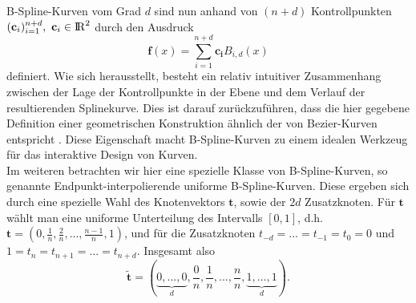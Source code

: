 \documentclass{article}
\newcommand{\R}{{\rm I\!R}}
\begin{document}
\noindent B-Spline-Kurven vom Grad $d$ sind nun anhand von $(n+d)$ Kontrollpunkten $(\mathbf{c}_i)_{i=1}^{n+d},\ \mathbf{c}_i\in\R^2$ durch den Ausdruck
\[
\mathbf{f}(x)=\sum_{i=1}^{n+d}\mathbf{c_i}B_{i,d}(x)
\]
definiert. Wie sich herausstellt, besteht ein relativ intuitiver Zusammenhang zwischen der Lage der Kontrollpunkte in der Ebene und dem Verlauf der resultierenden Splinekurve. Dies ist darauf zurückzuführen, dass die hier gegebene Definition einer geometrischen Konstruktion ähnlich der von Bezier-Kurven entspricht
. Diese Eigenschaft macht B-Spline-Kurven zu einem idealen Werkzeug für das interaktive Design von Kurven.\\

\noindent Im weiteren betrachten wir hier eine spezielle Klasse von B-Spline-Kurven, so genannte Endpunkt-interpolierende uniforme B-Spline-Kurven. Diese ergeben sich durch eine spezielle Wahl des Knotenvektors $\mathbf{t}$, sowie der $2d$ Zusatzknoten. Für $\mathbf{t}$ wählt man eine uniforme Unterteilung des Intervalls $[0,1]$, d.h. $\mathbf{t}=(0,\frac{1}{n},\frac{2}{n},...,\frac{n-1}{n},1)$, und für die Zusatzknoten $t_{-d}=...=t_{-1}=t_0=0$ und $1=t_n=t_{n+1}=...=t_{n+d}$. Insgesamt also
\[
\mathbf{\tilde{t}}=(\underbrace{0,...,0}_{d},\frac{0}{n},\frac{1}{n},...,\frac{n}{n},\underbrace{1,...,1}_{d}).
\]
\end{document}
